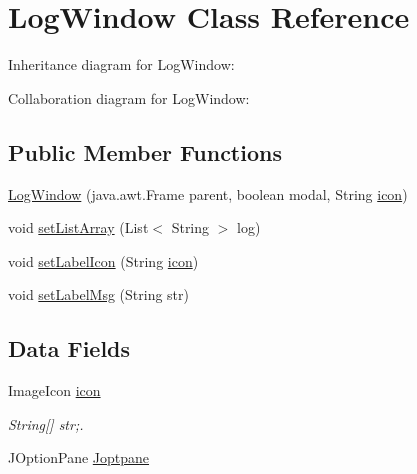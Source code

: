 \hypertarget{class_microchip_m_p_f_s_1_1_log_window}{}\section{Log\+Window Class Reference}
\label{class_microchip_m_p_f_s_1_1_log_window}


Inheritance diagram for Log\+Window\+:


Collaboration diagram for Log\+Window\+:
\subsection*{Public Member Functions}
\begin{DoxyCompactItemize}
\item 
\hyperlink{class_microchip_m_p_f_s_1_1_log_window_a6d46b5514a38308f2117199a6ff48927}{Log\+Window} (java.\+awt.\+Frame parent, boolean modal, String \hyperlink{class_microchip_m_p_f_s_1_1_log_window_a12902116051c1f10f030e7e7416cf53c}{icon})
\item 
void \hyperlink{class_microchip_m_p_f_s_1_1_log_window_a48b56900ed0b1d18a206449b7bea8905}{set\+List\+Array} (List$<$ String $>$ log)
\item 
void \hyperlink{class_microchip_m_p_f_s_1_1_log_window_a81359718e90cc239ad1149177c3359da}{set\+Label\+Icon} (String \hyperlink{class_microchip_m_p_f_s_1_1_log_window_a12902116051c1f10f030e7e7416cf53c}{icon})
\item 
void \hyperlink{class_microchip_m_p_f_s_1_1_log_window_aab0491a964c0e4789c4ea9d64a67ca90}{set\+Label\+Msg} (String str)
\end{DoxyCompactItemize}
\subsection*{Data Fields}
\begin{DoxyCompactItemize}
\item 
Image\+Icon \hyperlink{class_microchip_m_p_f_s_1_1_log_window_a12902116051c1f10f030e7e7416cf53c}{icon}
\begin{DoxyCompactList}\small\item\em String\mbox{[}\mbox{]} str;. \end{DoxyCompactList}\item 
J\+Option\+Pane \hyperlink{class_microchip_m_p_f_s_1_1_log_window_a992fd16807c54cc8a48654acbf898b55}{Joptpane}
\end{DoxyCompactItemize}


